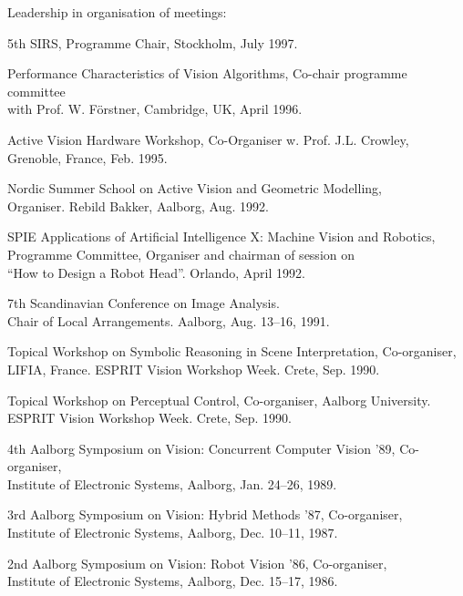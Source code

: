 \documentclass{article}
\begin{document}
\begin{cv}
\begin{cvlist}{Leadership in organisation of meetings:}
		\item 5th SIRS, Programme Chair, Stockholm, \cftdotfill{\cftdotsep} July 1997.
		\item Performance Characteristics of Vision Algorithms, Co-chair programme
		committee\\ with Prof. W. F\"orstner, Cambridge, UK, \cftdotfill{\cftdotsep}
		April 1996.
		\item Active Vision Hardware Workshop, Co-Organiser w. Prof. J.L. Crowley,
		\\Grenoble, France,\cftdotfill{\cftdotsep} Feb. 1995.
		\item Nordic Summer School on Active Vision and Geometric Modelling, \\
		Organiser. Rebild Bakker, Aalborg, \cftdotfill{\cftdotsep} Aug. 1992.
		\item SPIE Applications of Artificial Intelligence X: Machine Vision and
		Robotics, \\ Programme Committee, Organiser and chairman of session on\\ ``How
		to Design a Robot Head''. Orlando, \cftdotfill{\cftdotsep} April 1992.
		\item 7th Scandinavian Conference on Image Analysis. \\Chair of Local
		Arrangements. Aalborg, \cftdotfill{\cftdotsep} Aug. 13--16, 1991.
		\item Topical Workshop on Symbolic Reasoning in Scene Interpretation,
		Co-organiser, \\LIFIA, France. ESPRIT Vision Workshop Week. Crete,
		\cftdotfill{\cftdotsep} Sep. 1990.
		\item Topical Workshop on Perceptual Control, Co-organiser, Aalborg
		University. \\ ESPRIT Vision Workshop Week. Crete, \cftdotfill{\cftdotsep}
		Sep. 1990.
		\item 4th Aalborg Symposium on Vision: Concurrent Computer Vision '89,
		Co-organiser, \\ Institute of Electronic Systems, Aalborg,
		\cftdotfill{\cftdotsep} Jan. 24--26, 1989.
		\item 3rd Aalborg Symposium on Vision: Hybrid Methods '87, Co-organiser, \\
		Institute of Electronic Systems, Aalborg, \cftdotfill{\cftdotsep} Dec. 10--11,
		1987.
		\item 2nd Aalborg Symposium on Vision: Robot Vision '86, Co-organiser, \\
		Institute of Electronic Systems, Aalborg, \cftdotfill{\cftdotsep} Dec. 15--17,
		1986.
	\end{cvlist}


\end{cv}
\end{document}
